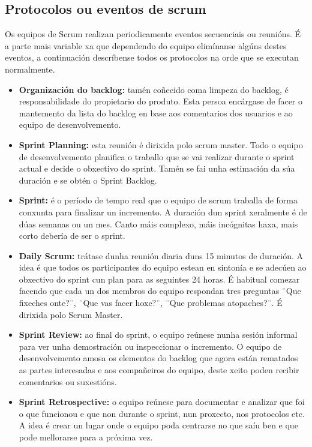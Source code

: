 \subsection{Protocolos ou eventos de scrum}
Os equipos de Scrum realizan periodicamente eventos secuenciais ou reunións. É a parte mais variable xa que dependendo do equipo elimínanse algúns destes eventos, a continuación descríbense todos os protocolos na orde que se executan normalmente.
\begin{itemize}
	\item[--] \textbf{Organización do backlog:} tamén coñecido coma limpeza do backlog, é responsabilidade do propietario do produto. Esta persoa encárgase de facer o mantemento da lista do backlog en base aos comentarios dos usuarios e ao equipo de desenvolvemento.
	\item[--] \textbf{Sprint Planning:} esta reunión é dirixida polo scrum master. Todo o equipo de desenvolvemento planifica o traballo que se vai realizar durante o sprint actual e decide o obxectivo do sprint. Tamén se fai unha estimación da súa duración e se obtén o Sprint Backlog.
		~\label{scrum:planning}
	\item[--] \textbf{Sprint:} é o período de tempo real que o equipo de scrum traballa de forma conxunta para finalizar un incremento. A duración dun sprint xeralmente é de dúas semanas ou un mes. Canto máis complexo, máis incógnitas haxa, mais corto debería de ser o sprint.
	\item[--] \textbf{Daily Scrum:} trátase dunha reunión diaria duns 15 minutos de duración. A idea é que todos os participantes do equipo estean en sintonía e se adecúen ao obxectivo do sprint cun plan para as seguintes 24 horas. É habitual comezar facendo que cada un dos membros do equipo respondan tres preguntas ¨Que fixeches onte?¨, ¨Que vas facer hoxe?¨, ¨Que problemas atopaches?¨. É dirixida polo Scrum Master.
		~\label{scrum:daily}
	\item[--] \textbf{Sprint Review:} ao final do sprint, o equipo reúnese nunha sesión informal para ver unha demostración ou inspeccionar o incremento. O equipo de desenvolvemento amosa os elementos do backlog que agora están rematados as partes interesadas e aos compañeiros do equipo, deste xeito poden recibir comentarios ou suxestións.
		~\label{scrum:review}
	\item[--] \textbf{Sprint Retrospective:} o equipo reúnese para documentar e analizar que foi o que funcionou e que non durante o sprint, nun proxecto, nos protocolos etc. A idea é crear un lugar onde o equipo poda centrarse no que saíu ben e que pode mellorarse para a próxima vez.
		~\label{scrum:retrospective}
\end{itemize}

